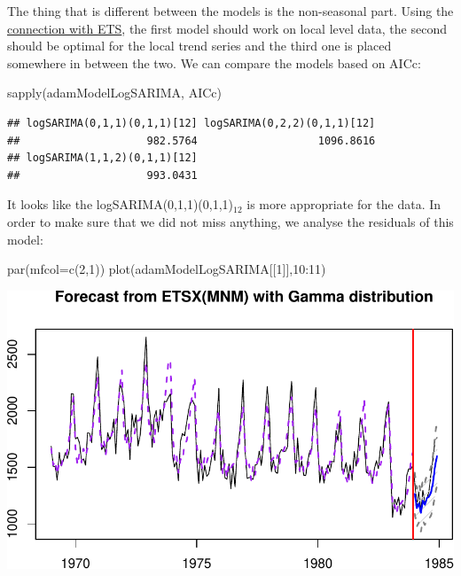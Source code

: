 \documentclass[
]{book}
\newenvironment{Shaded}{\begin{snugshade}}{\end{snugshade}}
\newcommand{\AttributeTok}[1]{\textcolor[rgb]{0.77,0.63,0.00}{#1}}
\newcommand{\DecValTok}[1]{\textcolor[rgb]{0.00,0.00,0.81}{#1}}
\newcommand{\FunctionTok}[1]{\textcolor[rgb]{0.00,0.00,0.00}{#1}}
\newcommand{\NormalTok}[1]{#1}
\newcommand{\SpecialCharTok}[1]{\textcolor[rgb]{0.00,0.00,0.00}{#1}}
\theoremstyle{definition}
\theoremstyle{definition}
\theoremstyle{definition}
\theoremstyle{definition}
\theoremstyle{remark}
\begin{document}
The thing that is different between the models is the non-seasonal part. Using the \protect\hyperlink{ARIMAandETS}{connection with ETS}, the first model should work on local level data, the second should be optimal for the local trend series and the third one is placed somewhere in between the two. We can compare the models based on AICc:

\begin{Shaded}
\begin{Highlighting}[]
\FunctionTok{sapply}\NormalTok{(adamModelLogSARIMA, AICc)}
\end{Highlighting}
\end{Shaded}

\begin{verbatim}
## logSARIMA(0,1,1)(0,1,1)[12] logSARIMA(0,2,2)(0,1,1)[12] 
##                    982.5764                   1096.8616 
## logSARIMA(1,1,2)(0,1,1)[12] 
##                    993.0431
\end{verbatim}

It looks like the logSARIMA(0,1,1)(0,1,1)\(_{12}\) is more appropriate for the data. In order to make sure that we did not miss anything, we analyse the residuals of this model:

\begin{Shaded}
\begin{Highlighting}[]
\FunctionTok{par}\NormalTok{(}\AttributeTok{mfcol=}\FunctionTok{c}\NormalTok{(}\DecValTok{2}\NormalTok{,}\DecValTok{1}\NormalTok{))}
\FunctionTok{plot}\NormalTok{(adamModelLogSARIMA[[}\DecValTok{1}\NormalTok{]],}\DecValTok{10}\SpecialCharTok{:}\DecValTok{11}\NormalTok{)}
\end{Highlighting}
\end{Shaded}

\includegraphics{adam_files/figure-latex/unnamed-chunk-69-1.pdf}
\end{document}
